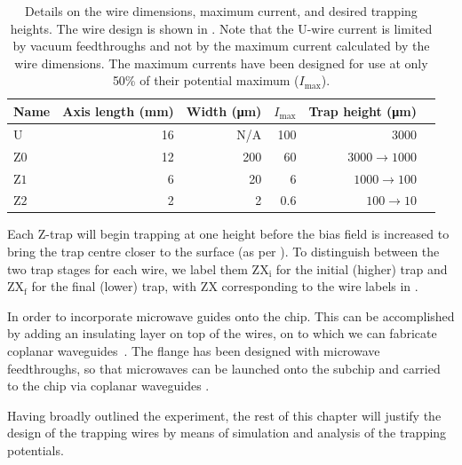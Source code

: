 \begin{table}
  \centering
\begin{tabular}{lrrrrr}
  Name & Axis length (\si{\milli\meter}) & Width (\si{\micro\meter})& $I_\text{max}$ & Trap height (\si{\micro\meter}) \\
 \hline
  U & 16 & N/A& 100 & 3000\\
  $\mathrm{Z0}$ & 12 & 200& 60& $3000\rightarrow1000$ \\
  $\mathrm{Z1}$ &  6 & 20& 6& $1000\rightarrow100$ \\
  $\mathrm{Z2}$ &  2 & 2& 0.6& $100\rightarrow10$ \\
 \hline
\end{tabular}
  \caption{Details on the wire dimensions, maximum current, and desired
  trapping heights. The wire design is shown in
  . Note that the U-wire current is
  limited by vacuum feedthroughs and not by the maximum current calculated by
  the wire dimensions.  The maximum currents have been designed for use at only
  50\% of their potential maximum ($I_\text{max}$).
  }
  \label{overview:table:wires}
\end{table}

Each Z-trap will begin trapping at one height before the bias field is
increased to bring the trap centre closer to the surface (as per
).  To distinguish between the two trap stages for
each wire, we label them $\mathrm{ZX_i}$ for the initial (higher) trap and
$\mathrm{ZX_f}$ for the final (lower) trap, with $\mathrm{ZX}$ corresponding to
the wire labels in .

In order to incorporate microwave guides onto the chip. This can be
accomplished by adding an insulating layer on top of the wires, on to which we
can fabricate coplanar waveguides~\cite{1127105}. The flange has been designed
with microwave feedthroughs, so that microwaves can be launched onto the
subchip and carried to the chip via coplanar waveguides .

Having broadly outlined the experiment, the rest of this chapter will justify
the design of the trapping wires by means of simulation and analysis
of the trapping potentials.

